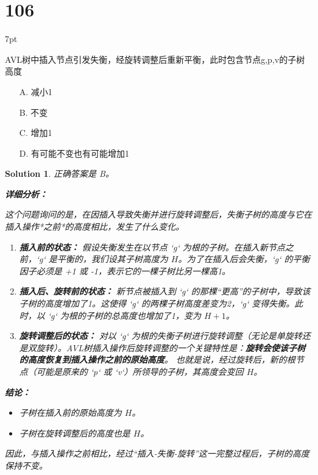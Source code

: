 \documentclass[UTF8]{report}
\newtheorem{solution}{Solution}
\theoremstyle{MyLineTheoremStyle} %
\theoremstyle{MyBlockTheoremStyle} %
\theoremstyle{MySubsubsectionStyle} %
\newenvironment{graybox}{%
        \def\FrameCommand{%
        \hspace{1pt}%
        {\color{gray}\small \vrule width 2pt}%
        {\color{graybox_color}\vrule width 4pt}%
        \colorbox{graybox_color}%
        }%
        \MakeFramed{\advance\hsize-\width\FrameRestore}%
        \noindent\hspace{-4.55pt}%
        \begin{adjustwidth}{}{7pt}%
        \vspace{2pt}\vspace{2pt}%
        }
        {%
        \vspace{2pt}\end{adjustwidth}\endMakeFramed%
        }
\begin{document}
\section*{106}
\begin{graybox}
AVL树中插入节点引发失衡，经旋转调整后重新平衡，此时包含节点g,p,v的子树高度
\begin{itemize}
\item[A.] 减小1
\item[B.] 不变
\item[C.] 增加1
\item[D.] 有可能不变也有可能增加1
\end{itemize}
\end{graybox}

\begin{solution}
正确答案是 B。

\textbf{详细分析：}

这个问题询问的是，在因插入导致失衡并进行旋转调整后，失衡子树的高度与它在插入操作*之前*的高度相比，发生了什么变化。

\begin{enumerate}
    \item \textbf{插入前的状态：}
    假设失衡发生在以节点 `g` 为根的子树。在插入新节点之前，`g` 是平衡的，我们设其子树高度为 $H$。为了在插入后会失衡，`g` 的平衡因子必须是 +1 或 -1，表示它的一棵子树比另一棵高1。

    \item \textbf{插入后、旋转前的状态：}
    新节点被插入到 `g` 的那棵“更高”的子树中，导致该子树的高度增加了1。这使得 `g` 的两棵子树高度差变为2，`g` 变得失衡。此时，以 `g` 为根的子树的总高度也增加了1，变为 $H+1$。

    \item \textbf{旋转调整后的状态：}
    对以 `g` 为根的失衡子树进行旋转调整（无论是单旋转还是双旋转）。AVL树插入操作后旋转调整的一个关键特性是：\textbf{旋转会使该子树的高度恢复到插入操作之前的原始高度}。
    也就是说，经过旋转后，新的根节点（可能是原来的 `p` 或 `v`）所领导的子树，其高度会变回 $H$。
\end{enumerate}

\textbf{结论：}
\begin{itemize}
    \item 子树在插入前的原始高度为 $H$。
    \item 子树在旋转调整后的高度也是 $H$。
\end{itemize}
因此，与插入操作之前相比，经过“插入-失衡-旋转”这一完整过程后，子树的高度保持不变。
\end{solution}
\end{document}
